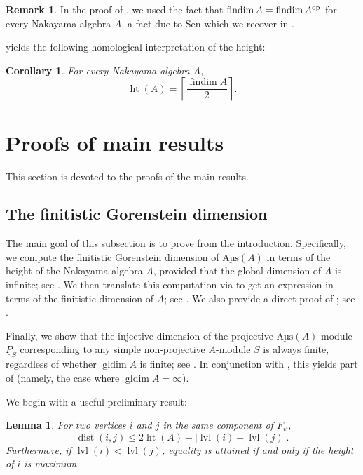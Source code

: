 \documentclass[a4paper]{amsart}
\newtheorem{corollary}[theorem]{Corollary}
\newtheorem{lemma}[theorem]{Lemma}
\theoremstyle{definition}
\newtheorem{remark}[theorem]{Remark}
\theoremstyle{remark}
\numberwithin{equation}{theorem}
\newcommand{\findim}{\operatorname{findim}}
\newcommand{\sAus}{\operatorname{\underline{Aus}}}
\newcommand{\pstab}[1]{\underline{P}_{#1}}
\newcommand{\height}{\operatorname{ht}}
\newcommand{\ceilfindim}[1]{\left\lceil\frac{\findim #1}{2}\right\rceil}
\newcommand{\gldim}{\operatorname{gldim}}
\newcommand{\dist}{\operatorname{dist}}
\newcommand{\level}{\operatorname{lvl}}
\newcommand{\psiforest}{F_\psi}
\newcommand{\op}{\textnormal{op}}
\begin{document}
\begin{remark}
    In the proof of , we used the fact that $ \findim A = \findim A^\op $ for every Nakayama algebra $ A $, a fact due to Sen \cite{Se2} which we recover in .
\end{remark}


 yields the following homological interpretation of the height:

\begin{corollary} \label{prop:heightfindim}
For every Nakayama algebra $A$,
\[
  \height(A)=\ceilfindim{A}.
\]
\end{corollary}


\section{Proofs of main results}\label{sec:main-results}

This section is devoted to the proofs of the main results.

\subsection{The finitistic Gorenstein dimension}\label{sec:main-results-bounds}

The main goal of this subsection is to prove  from the introduction. Specifically, we compute the finitistic Gorenstein dimension of $\sAus(A)$ in terms of the height of the Nakayama algebra $ A $, provided that the global
dimension of $A$ is infinite; see .
We then translate this computation via  to get an expression in terms of the finitistic dimension of $ A $; see . We also provide a direct proof of ; see .

Finally, we show that the injective dimension of the projective $ \sAus(A) $-module $ \pstab S $ corresponding to any simple non-projective $ A $-module $ S $ is always finite, regardless of whether $ \gldim A $ is finite; see . In conjunction with , this yields part of  (namely, the case where $\gldim A = \infty$).

We begin with a useful preliminary result:

\begin{lemma}\label{cor:distance}
    For two vertices $ i $ and $ j $ in the same component of $ \psiforest $,
        \[
            \dist(i,j) \leq 2 \height(A) + | \level(i) - \level(j) | .
        \]
    Furthermore, if $ \level(i) < \level(j) $, equality is attained if and only if the height of $ i $ is maximum.
\end{lemma}
\end{document}
